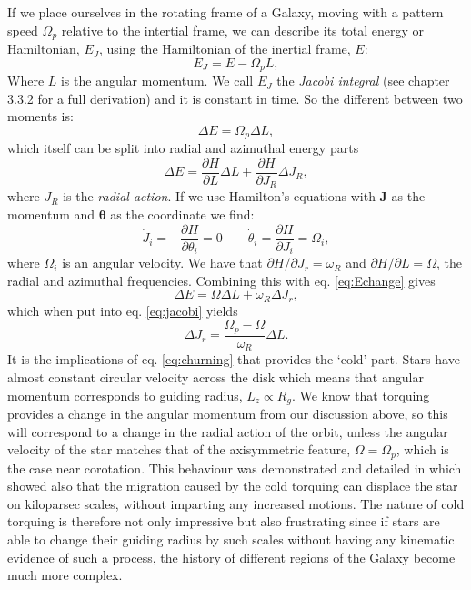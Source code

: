 If we place ourselves in the rotating frame of a Galaxy, moving with a pattern speed $\Omega_p$ relative to the intertial frame, we can describe its total energy or Hamiltonian, $E_J$, using the Hamiltonian of the inertial frame, $E$:
\begin{equation}\label{eq:jacobi}
    E_J = E - \Omega_pL,
\end{equation}
Where $L$ is the angular momentum. We call $E_J$ the \textit{Jacobi integral} (see \citealt{binney:08} chapter 3.3.2 for a full derivation) and it is constant in time. So the different between two moments is:
\begin{equation}
    \Delta E = \Omega_p\Delta L,
\end{equation}
which itself can be split into radial and azimuthal energy parts
\begin{equation}\label{eq:Echange}
    \Delta E = \frac{\partial H}{\partial L}\Delta L + \frac{\partial H}{\partial J_R}\Delta J_R,
\end{equation}
where $J_R$ is the \textit{radial action}. If we use Hamilton's equations with $\pmb{J}$ as the momentum and $\pmb{\theta}$ as the coordinate we find:
\begin{equation}
    \dot{J}_i = - \frac{\partial H}{\partial \theta_i} = 0 \qquad \dot{\theta}_i = \frac{\partial H}{\partial J_i} = \Omega_i,
\end{equation}
where $\Omega_i$ is an angular velocity. We have that $\partial H / \partial J_r = \omega_R$ and $\partial H / \partial L = \Omega$, the radial and azimuthal frequencies. Combining this with eq. \eqref{eq:Echange} gives
\begin{equation}
    \Delta E = \Omega\Delta L + \omega_R \Delta J_r,
\end{equation}
which when put into eq. \eqref{eq:jacobi} yields
\begin{equation}\label{eq:churning}
    \Delta J_r = \frac{\Omega_p - \Omega}{\omega_R}\Delta L.
\end{equation}
It is the implications of eq. \eqref{eq:churning} that provides the `cold' part. Stars have almost constant circular velocity across the disk which means that angular momentum corresponds to guiding radius, $L_z \propto R_g$. We know that torquing provides a change in the angular momentum from our discussion above, so this will correspond to a change in the radial action of the orbit, unless the angular velocity of the star matches that of the axisymmetric feature, $\Omega = \Omega_p$, which is the case near corotation. This behaviour was demonstrated and detailed in \cite{sellwood:02} which showed also that the migration caused by the cold torquing can displace the star on kiloparsec scales, without imparting any increased motions. The nature of cold torquing is therefore not only impressive but also frustrating since if stars are able to change their guiding radius by such scales without having any kinematic evidence of such a process, the history of different regions of the Galaxy become much more complex. 

